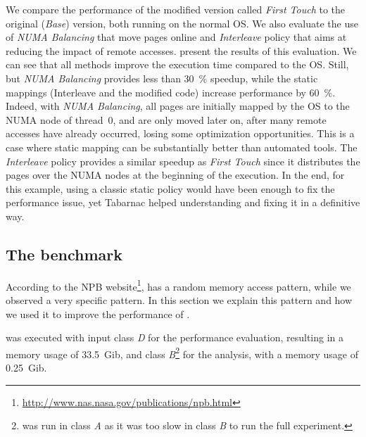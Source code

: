We compare the performance of the modified version called \emph{First Touch} to the original (\emph{Base}) version, both running on the normal OS.
We also evaluate the use of \emph{NUMA Balancing} that move pages online and \emph{Interleave} policy that aims at reducing the impact of remote accesses.
 present the results of this evaluation.
We can see that all methods improve the execution time compared to the \gls{OS}.
Still, but \emph{NUMA Balancing} provides less than \SI{30}{\%} speedup, while the static mappings (Interleave and the modified code) increase performance by \SI{60}{\%}.
Indeed, with \emph{NUMA Balancing}, all pages are initially mapped by the \gls{OS} to the \gls{NUMA} node of thread~$0$, and are only moved later on, after many remote accesses have already occurred, losing some optimization opportunities.
This is a case where static mapping can be substantially better than automated tools.
The \emph{Interleave} policy provides a similar speedup as \emph{First Touch} since it distributes the pages over the \gls{NUMA} nodes at the beginning of the execution.
In the end, for this example, using a classic static policy would have been enough to fix the performance issue, yet \gls{Tabarnac} helped understanding and fixing it in a definitive way.

\subsection{The \IS benchmark}


According to the \gls{NPB} website\footnote{\url{http://www.nas.nasa.gov/publications/npb.html}}, \IS has a random memory access pattern, while we observed a very specific pattern.
In this section we explain this pattern and how we used it to improve the performance of \IS.

\IS was executed with input class \emph{D} for the performance evaluation, resulting in a memory usage of \SI{33.5}{Gib}, and class \emph{B}\footnote{
    \DC was run in class \emph{A} as it was too slow in class \emph{B} to run the full experiment.}
    for the analysis, with a memory usage of \SI{0.25}{Gib}.

